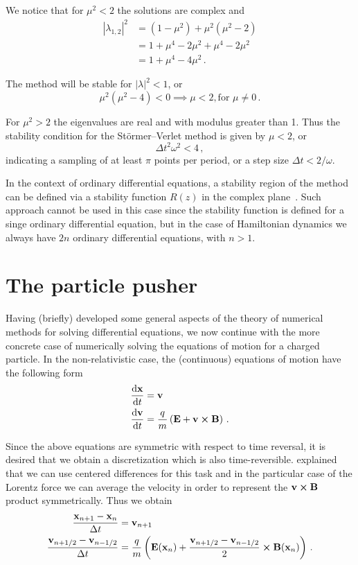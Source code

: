 \documentclass[12pt, class=report, crop=false]{standalone}
\begin{document}
We notice that for \(\mu^2 < 2\) the solutions are complex and
\begin{align*}
  |\lambda_{1,2}|^2 &= (1-\mu^2) + \mu^2 (\mu^2-2) \\
  &= 1+\mu^4-2\mu^2+\mu^4-2\mu^2 \\
  &= 1+\mu^4-4\mu^2\,.
\end{align*}

The method will be stable for \(|\lambda|^2 < 1\), or
\[
\mu^2 (\mu^2 - 4) < 0 \implies \mu < 2, \text{for } \mu \ne 0\,.
\]

For \(\mu^2 > 2\) the eigenvalues are real and with modulus greater than 1.
Thus the stability condition for the Störmer–Verlet method is given by \(\mu < 2\),
or
\[
\Delta t^2 \omega^2 < 4\,,
\]
indicating a sampling of at least \(\pi\) points per period, or a step size
\(\Delta t < 2/\omega\).

In the context of ordinary differential equations, a stability region of the method
can be defined via a stability function \(R(z)\) in the complex
plane~\autocite[81]{butcher_numericalmethods_2016}. Such approach cannot be used
in this case since the stability function is defined for a singe ordinary
differential equation, but in the case of Hamiltonian dynamics we always have
\(2n\) ordinary differential equations, with \(n>1\).

\section{The particle pusher}

Having (briefly) developed some general aspects of the theory of numerical methods
for solving differential equations, we now continue with the more concrete case
of numerically solving the equations of motion for a charged particle.
In the non-relativistic case, the (continuous) equations of motion have the
following form
\begin{align*}
  \dv{\vb{x}}{t} &= \vb{v} \\
  \dv{\vb{v}}{t} &= \frac{q}{m} \left(\vb{E} + \vb{v}\cp\vb{B}\right)\,.
\end{align*}

Since the above equations are symmetric with respect to time reversal, it is
desired that we obtain a discretization which is also time-reversible.
\Textcite{buneman_timereversibledifference_1967} explained that we can
use centered differences for this task and in the particular case of the
Lorentz force we can average the velocity in order to represent the
\(\vb{v} \cp \vb{B}\) product symmetrically. Thus we obtain
\begin{align}
  \label{eq:lorentz-discrete-x}
  \frac{\vb{x}_{n+1}-\vb{x}_n}{\Delta t} &= \vb{v}_{n+1} \\
  \label{eq:lorentz-discrete-v}
  \frac{\vb{v}_{n+1/2}-\vb{v}_{n-1/2}}{\Delta t} &= \frac{q}{m}
    \left(\vb{E}(\vb{x}_n) + \frac{\vb{v}_{n+1/2}-\vb{v}_{n-1/2}}{2} \cp \vb{B}(\vb{x}_n)\right)\,.
\end{align}
\end{document}
